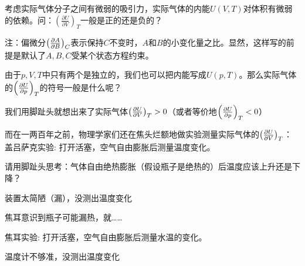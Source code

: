 \documentclass[CJK]{beamer}
\begin{document}
\begin{frame}
\bch
{}

{\large
考虑实际气体分子之间有微弱的吸引力，实际气体的内能$U(V,T)$对体积有微弱的依赖。问：$\left(\frac{\partial U}{\partial V}\right)_T$一般是正的还是负的？
}
\skiplines

注：{\blue 偏微分$\left(\frac{\partial A}{\partial B}\right)_{C}$表示保持$C$不变时，$A$和$B$的小变化量之比}。显然，这样写的前提是{\blue 默认了$A,B,C$受某个状态方程约束}。
\ech
\end{frame}


\begin{frame}
\bch
{}

{\large
由于$p, V, T$中只有两个是独立的，我们也可以把内能写成$U(p, T)$。那么实际气体的$\left(\frac{\partial U}{\partial p}\right)_{T}$的符号一般是什么呢？
}

\ech
\end{frame}

\begin{frame}
\bch
我们用脚趾头就想出来了实际气体$\left(\frac{\partial U}{\partial V}\right)_{T} > 0$（或者等价地$\left(\frac{\partial U}{\partial p}\right)_{T} < 0$）

而在一两百年之前，物理学家们还在焦头烂额地做实验测量实际气体的$\left(\frac{\partial U}{\partial V}\right)_{T} $：
盖吕萨克实验: 打开活塞，空气自由膨胀后测量温度变化。

请用脚趾头思考：气体自由绝热膨胀（假设瓶子是绝热的）后温度应该上升还是下降？
\emini
{}
\emini

\ech
\end{frame}


\begin{frame}
\bch


装置太简陋（漏），没测出温度变化 
\ech
\end{frame}

\begin{frame}
\bch
焦耳意识到瓶子可能漏热，就……

焦耳实验: 打开活塞，空气自由膨胀后测量水温的变化。
\emini
{}
\emini

\ech
\end{frame}


\begin{frame}
\bch


温度计不够准，没测出温度变化 
\ech
\end{frame}
\end{document}
